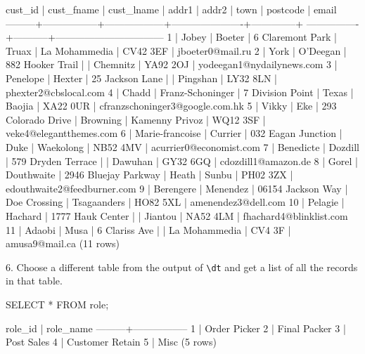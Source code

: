 \begin{pseudo*}
cust_id |   cust_fname    |    cust_lname    |        addr1         |    addr2     |      town      | postcode  |              email
---------+-----------------+------------------+----------------------+--------------+ ----------------+-----------+---------------------------------
        1 | Jobey           | Boeter           | 6 Claremont Park     | Truax        | La Mohammedia  | CV42 3EF  | jboeter0@mail.ru
        2 | York            | O'Deegan         | 882 Hooker Trail     |              | Chemnitz       | YA92 2OJ  | yodeegan1@nydailynews.com
        3 | Penelope        | Hexter           | 25 Jackson Lane      |              | Pingshan       | LY32 8LN  | phexter2@cbslocal.com
        4 | Chadd           | Franz-Schoninger | 7 Division Point     | Texas        | Baojia         | XA22 0UR  | cfranzschoninger3@google.com.hk
        5 | Vikky           | Eke              | 293 Colorado Drive   | Browning     | Kamenny Privoz | WQ12 3SF  | veke4@elegantthemes.com
        6 | Marie-francoise | Currier          | 032 Eagan Junction   | Duke         | Waekolong      | NB52 4MV  | acurrier0@economist.com
        7 | Benedicte       | Dozdill          | 579 Dryden Terrace   |              | Dawuhan        | GY32 6GQ  | cdozdill1@amazon.de
        8 | Gorel           | Douthwaite       | 2946 Bluejay Parkway | Heath        | Sunbu          | PH02 3ZX  | edouthwaite2@feedburner.com
        9 | Berengere       | Menendez         | 06154 Jackson Way    | Doe Crossing | Tsagaanders    | HO82 5XL  | amenendez3@dell.com
        10 | Pelagie         | Hachard          | 1777 Hauk Center     |              | Jiantou        | NA52 4LM  | fhachard4@blinklist.com
        11 | Adaobi          | Musa             | 6 Clariss Ave        |              | La Mohammedia  | CV4 3F    | amusa9@mail.ca
(11 rows)
\end{pseudo*}

6. Choose a different table from the output of \verb|\dt| and get a list of all the records in that table.
\begin{sql}
SELECT * FROM role;
\end{sql}
\begin{pseudo*}
role_id |    role_name
---------+-----------------
   1 | Order Picker
    2 | Final Packer
    3 | Post Sales
    4 | Customer Retain
    5 | Misc
(5 rows)
\end{pseudo*}